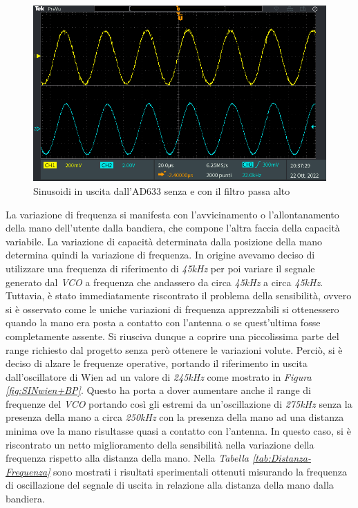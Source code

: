 \documentclass[titlepage]{report}
\begin{document}
	 \begin{figure}[H]
		\centering
		\includegraphics[scale = 0.5]{Immagini/sin_ad633+lp4_ad633+lp4+hp1.PNG}
		\caption{Sinusoidi in uscita dall'AD633 senza e con il filtro passa alto}
		\label{fig:AD33+LPconsenzaHP}
	\end{figure}


	La variazione di frequenza si manifesta con l'avvicinamento o l'allontanamento della mano dell'utente dalla bandiera, che compone l'altra faccia della capacità variabile. La variazione di capacità determinata dalla posizione della mano determina quindi la variazione di frequenza.
	In origine avevamo deciso di utilizzare una frequenza di riferimento di \textit{45kHz} per poi variare il segnale generato dal \textit{VCO} a frequenza che andassero da circa \textit{45kHz} a circa \textit{45kHz}.
	Tuttavia, è stato immediatamente riscontrato il problema della sensibilità, ovvero si è osservato come le uniche variazioni di frequenza apprezzabili si ottenessero quando la mano era posta a contatto con l'antenna o se quest'ultima fosse completamente assente. Si riusciva dunque a coprire una piccolissima parte del range richiesto dal progetto senza però ottenere le variazioni volute.
	Perciò, si è deciso di alzare le frequenze operative, portando il riferimento in uscita dall'oscillatore di Wien ad un valore di \textit{245kHz} come mostrato in \textit{Figura \ref{fig:SINwien+BP}}. Questo ha porta a dover aumentare anche il range di frequenze del \textit{VCO} portando così gli estremi da un'oscillazione di \textit{275kHz} senza la presenza della mano a circa \textit{250kHz} con la presenza della mano ad una distanza minima ove la mano risultasse quasi a contatto con l'antenna.
	In questo caso, si è riscontrato un netto miglioramento della sensibilità nella variazione della frequenza rispetto alla distanza della mano.
	Nella \textit{Tabella \ref{tab:Distanza-Frequenza}} sono mostrati i risultati sperimentali ottenuti misurando la frequenza di oscillazione del segnale di uscita in relazione alla distanza della mano dalla bandiera.
\end{document}
